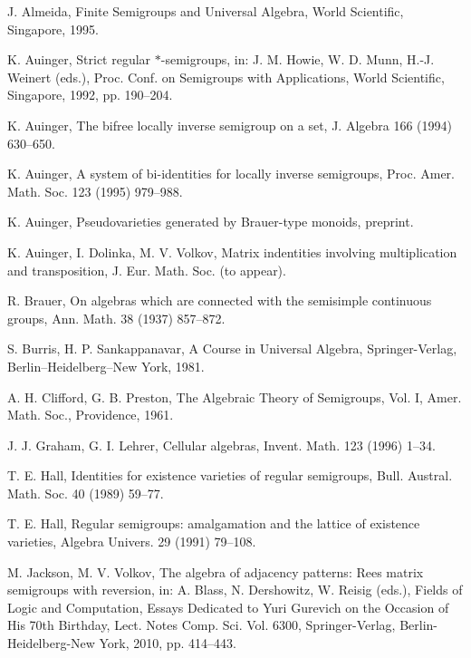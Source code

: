\documentclass[preprint,1p,times]{elsarticle}
\numberwithin{equation}{section}
\theoremstyle{remark}
\begin{document}
\begin{thebibliography}{99}
\frenchspacing

J. Almeida, Finite Semigroups and Universal Algebra, World Scientific, Singapore, 1995.

K. Auinger, Strict regular $*$-semigroups, in: J. M. Howie, W. D. Munn, H.-J. Weinert (eds.), Proc. Conf. on Semigroups
with Applications, World Scientific, Singapore, 1992, pp. 190--204.

K. Auinger, The bifree locally inverse semigroup on a set, J. Algebra 166 (1994) 630--650.

K. Auinger, A system of bi-identities for locally inverse semigroups, Proc. Amer. Math. Soc. 123 (1995) 979--988.

K. Auinger, Pseudovarieties generated by Brauer-type monoids, preprint.

K. Auinger, I. Dolinka, M. V. Volkov, Matrix indentities involving multiplication and transposition, J. Eur. Math. Soc.
(to appear).

R. Brauer, On algebras which are connected with the semisimple continuous groups, Ann. Math. 38 (1937) 857--872.

S. Burris, H. P. Sankappanavar, A Course in Universal Algebra, Springer-Verlag, Berlin--Heidelberg--New York, 1981.

A. H. Clifford, G. B. Preston, The Algebraic Theory of Semigroups, Vol. I, Amer. Math. Soc., Providence, 1961.


J. J. Graham, G. I. Lehrer, Cellular algebras, Invent. Math. 123 (1996) 1--34.

T. E. Hall, Identities for existence varieties of regular semigroups, Bull. Austral. Math. Soc. 40 (1989) 59--77.

T. E. Hall, Regular semigroups: amalgamation and the lattice of existence varieties, Algebra Univers. 29 (1991)
79--108.

M. Jackson, M. V. Volkov, The algebra of adjacency patterns: Rees matrix semigroups with reversion, in: A. Blass, N.
Dershowitz, W. Reisig (eds.), Fields of Logic and Computation, Essays Dedicated to Yuri Gurevich on the Occasion of His
70th Birthday, Lect. Notes Comp. Sci. Vol. 6300, Springer-Verlag, Berlin-Heidelberg-New York, 2010, pp. 414--443.


\end{thebibliography}
\end{document}

